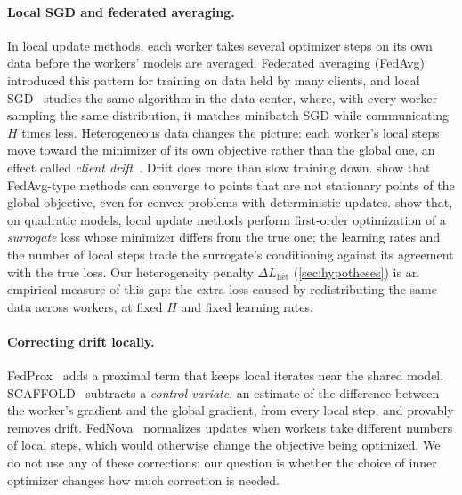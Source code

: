 \documentclass{article}
\newcommand{\Lhet}{\Delta L_{\mathrm{het}}}
\begin{document}
\paragraph{Local SGD and federated averaging.} In local update methods, each worker takes several optimizer steps on its own data before the workers' models are averaged. Federated averaging (FedAvg)~\cite{mcmahan2017fedavg} introduced this pattern for training on data held by many clients, and local SGD~\cite{stich2019local,lin2020dont} studies the same algorithm in the data center, where, with every worker sampling the same distribution, it matches minibatch SGD while communicating $H$ times less. Heterogeneous data changes the picture: each worker's local steps move toward the minimizer of its own objective rather than the global one, an effect called \emph{client drift}~\cite{zhao2018noniid,karimireddy2020scaffold,kairouz2021advances}. Drift does more than slow training down. \citet{pathak2020fedsplit} show that FedAvg-type methods can converge to points that are not stationary points of the global objective, even for convex problems with deterministic updates. \citet{charles2021convergence} show that, on quadratic models, local update methods perform first-order optimization of a \emph{surrogate} loss whose minimizer differs from the true one; the learning rates and the number of local steps trade the surrogate's conditioning against its agreement with the true loss. Our heterogeneity penalty $\Lhet$ (\cref{sec:hypotheses}) is an empirical measure of this gap: the extra loss caused by redistributing the same data across workers, at fixed $H$ and fixed learning rates.

\paragraph{Correcting drift locally.} FedProx~\cite{li2020fedprox} adds a proximal term that keeps local iterates near the shared model. SCAFFOLD~\cite{karimireddy2020scaffold} subtracts a \emph{control variate}, an estimate of the difference between the worker's gradient and the global gradient, from every local step, and provably removes drift. FedNova~\cite{wang2020fednova} normalizes updates when workers take different numbers of local steps, which would otherwise change the objective being optimized. We do not use any of these corrections: our question is whether the choice of inner optimizer changes how much correction is needed.
\end{document}
